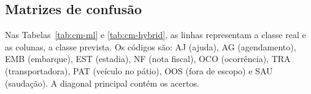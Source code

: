 \documentclass[conference]{IEEEtran}
\begin{document}
\subsection{Matrizes de confusão}

Nas Tabelas~\ref{tab:cm-ml} e \ref{tab:cm-hybrid}, as linhas representam a classe real e as colunas, a classe prevista. Os códigos são: AJ (ajuda), AG (agendamento), EMB (embarque), EST (estadia), NF (nota fiscal), OCO (ocorrência), TRA (transportadora), PAT (veículo no pátio), OOS (fora de escopo) e SAU (saudação). A diagonal principal contém os acertos.

\begin{table}[t]
\centering
\caption{Matriz de confusão do ML-only no OOD (limiar 0,55; 210 mensagens)}
\label{tab:cm-ml}
\scriptsize
\setlength{\tabcolsep}{4pt}
\end{table}
\end{document}
